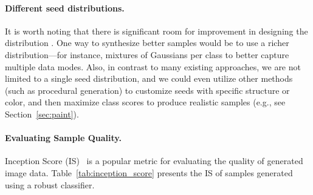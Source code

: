 \documentclass{article}
\begin{document}
\paragraph{Different seed distributions.} It is worth noting that there is significant 
room for improvement in designing the distribution . One way 
to synthesize better samples would be to use a richer distribution---for 
instance, mixtures of Gaussians per class to better capture multiple data modes. 
Also, in contrast to many existing approaches, we are not limited to a single seed distribution,
and we could even utilize other methods (such as procedural generation) 
to customize seeds with specific structure or color, and then maximize 
class scores to produce realistic samples (e.g., see Section~\ref{sec:paint}).

\paragraph{Evaluating Sample Quality.}
Inception Score (IS)~\cite{salimans2016improved} is a popular metric for
evaluating the quality of generated image data. 
Table~\ref{tab:inception_score} presents the IS of samples
generated using a robust classifier.
\end{document}
